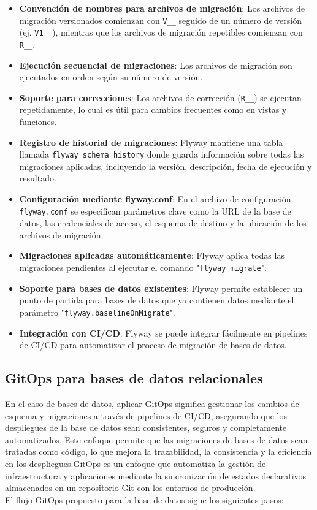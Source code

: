 \documentclass{IEEEtran}
\begin{document}
\begin{itemize}
    \item \textbf{Convención de nombres para archivos de migración}: Los archivos de migración versionados comienzan con \texttt{V\_\_} seguido de un número de versión (ej. \texttt{V1\_\_}), mientras que los archivos de migración repetibles comienzan con \texttt{R\_\_}.
    \item \textbf{Ejecución secuencial de migraciones}: Los archivos de migración son ejecutados en orden según su número de versión.
    \item \textbf{Soporte para correcciones}: Los archivos de corrección (\texttt{R\_\_}) se ejecutan repetidamente, lo cual es útil para cambios frecuentes como en vistas y funciones.
    \item \textbf{Registro de historial de migraciones}: Flyway mantiene una tabla llamada \texttt{flyway\_schema\_history} donde guarda información sobre todas las migraciones aplicadas, incluyendo la versión, descripción, fecha de ejecución y resultado.
    \item \textbf{Configuración mediante flyway.conf}: En el archivo de configuración \texttt{flyway.conf} se especifican parámetros clave como la URL de la base de datos, las credenciales de acceso, el esquema de destino y la ubicación de los archivos de migración.
    \item \textbf{Migraciones aplicadas automáticamente}: Flyway aplica todas las migraciones pendientes al ejecutar el comando "\texttt{flyway migrate}".
    \item \textbf{Soporte para bases de datos existentes}: Flyway permite establecer un punto de partida para bases de datos que ya contienen datos mediante el parámetro "\texttt{flyway.baselineOnMigrate}".
    \item \textbf{Integración con CI/CD}: Flyway se puede integrar fácilmente en pipelines de CI/CD para automatizar el proceso de migración de bases de datos.
\end{itemize}


\subsection{GitOps para bases de datos relacionales}
En el caso de bases de datos, aplicar GitOps significa gestionar los cambios de esquema y migraciones a través de pipelines de CI/CD, asegurando que los despliegues de la base de datos sean consistentes, seguros y completamente automatizados. Este enfoque permite que las migraciones de bases de datos sean tratadas como código, lo que mejora la trazabilidad, la consistencia y la eficiencia en los despliegues.GitOps es un enfoque que automatiza la gestión de infraestructura y aplicaciones mediante la sincronización de estados declarativos almacenados en un repositorio Git con los entornos de producción.\\ 
El flujo GitOps propuesto para la base de datos sigue los siguientes pasos:
\end{document}

